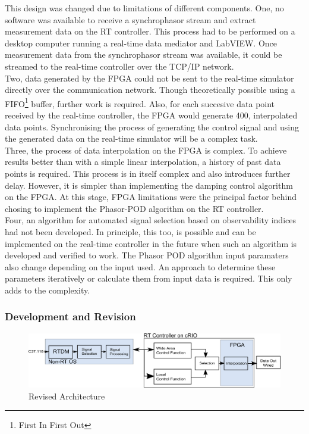 \documentclass[conference]{IEEEtran}
\begin{document}
This design was changed due to limitations of different components. One, no software was available to receive a synchrophasor stream and extract measurement data on the RT controller. This process had to be performed on a desktop computer running a real-time data mediator \cite{SDK} and LabVIEW. Once measurement data from the synchrophasor stream was available, it could be streamed to the real-time controller over the TCP/IP network.\\

Two, data generated by the FPGA could not be sent to the real-time simulator directly over the communication network. Though theoretically possible using a FIFO\footnote{First In First Out} buffer, further work is required. Also, for each succesive data point received by the real-time controller, the FPGA would generate 400, interpolated data points. Synchronising the process of generating the control signal and using the generated data on the real-time simulator will be a complex task.\\

Three, the process of data interpolation on the FPGA is complex. To achieve results better than with a simple linear interpolation, a history of past data points is required. This process is in itself complex and also introduces further delay. However, it is simpler than implementing the damping control algorithm on the FPGA. At this stage, FPGA limitations were the principal factor behind chosing to implement the Phasor-POD algorithm on the RT controller.\\

Four, an algorithm for automated signal selection based on observability indices had not been developed. In principle, this too, is possible and can be implemented on the real-time controller in the future when such an algorithm is developed and verified to work. The Phasor POD algorithm input paramaters also change depending on the input used. An approach to determine these parameters iteratively or calculate them from input data is required. This only adds to the complexity.\\

\subsubsection{Development and Revision}

\begin{figure}[!t]
\centering
\includegraphics[width=5in]{./Revision}
\caption{Revised Architecture}
\label{fig:Revision}
\end{figure}
\end{document}

